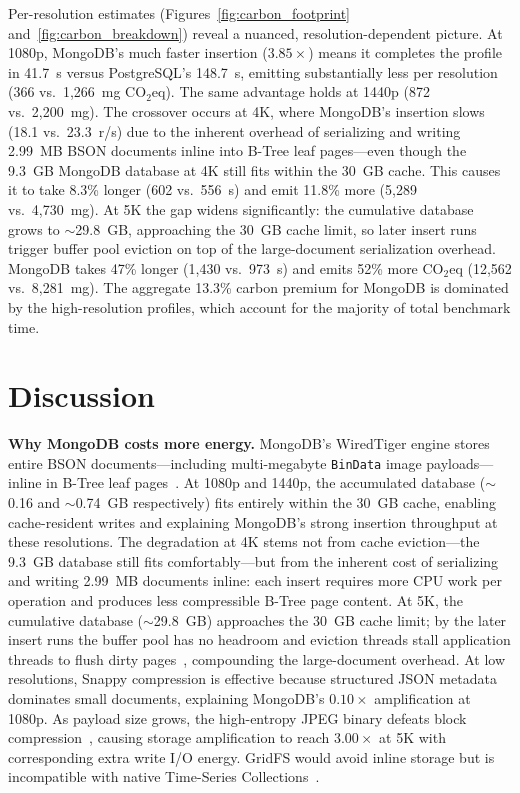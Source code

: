\documentclass[conference]{IEEEtran}
\begin{document}
Per-resolution estimates (Figures~\ref{fig:carbon_footprint} and~\ref{fig:carbon_breakdown}) reveal a nuanced, resolution-dependent picture. At 1080p, MongoDB's much faster insertion ($3.85\times$) means it completes the profile in 41.7~s versus PostgreSQL's 148.7~s, emitting substantially less per resolution (366 vs.\ 1,266~mg CO$_2$eq). The same advantage holds at 1440p (872 vs.\ 2,200~mg). The crossover occurs at 4K, where MongoDB's insertion slows (18.1 vs.\ 23.3~r/s) due to the inherent overhead of serializing and writing 2.99~MB BSON documents inline into B-Tree leaf pages---even though the 9.3~GB MongoDB database at 4K still fits within the 30~GB cache. This causes it to take 8.3\% longer (602 vs.\ 556~s) and emit 11.8\% more (5,289 vs.\ 4,730~mg). At 5K the gap widens significantly: the cumulative database grows to $\sim$29.8~GB, approaching the 30~GB cache limit, so later insert runs trigger buffer pool eviction on top of the large-document serialization overhead. MongoDB takes 47\% longer (1,430 vs.\ 973~s) and emits 52\% more CO$_2$eq (12,562 vs.\ 8,281~mg). The aggregate 13.3\% carbon premium for MongoDB is dominated by the high-resolution profiles, which account for the majority of total benchmark time.


\section{Discussion}
\label{sec:discussion}

\textbf{Why MongoDB costs more energy.} MongoDB's WiredTiger engine stores entire BSON documents---including multi-megabyte \texttt{BinData} image payloads---inline in B-Tree leaf pages~\cite{mongodb_bson_spec,mongodb_wiredtiger_storage}. At 1080p and 1440p, the accumulated database ($\sim$0.16 and $\sim$0.74~GB respectively) fits entirely within the 30~GB cache, enabling cache-resident writes and explaining MongoDB's strong insertion throughput at these resolutions. The degradation at 4K stems not from cache eviction---the 9.3~GB database still fits comfortably---but from the inherent cost of serializing and writing 2.99~MB documents inline: each insert requires more CPU work per operation and produces less compressible B-Tree page content. At 5K, the cumulative database ($\sim$29.8~GB) approaches the 30~GB cache limit; by the later insert runs the buffer pool has no headroom and eviction threads stall application threads to flush dirty pages~\cite{percona_wiredtiger_eviction}, compounding the large-document overhead. At low resolutions, Snappy compression is effective because structured JSON metadata dominates small documents, explaining MongoDB's $0.10\times$ amplification at 1080p. As payload size grows, the high-entropy JPEG binary defeats block compression~\cite{mongodb_wiredtiger_storage}, causing storage amplification to reach $3.00\times$ at 5K with corresponding extra write I/O energy. GridFS would avoid inline storage but is incompatible with native Time-Series Collections~\cite{mongodb_ts_limitations}.
\end{document}
